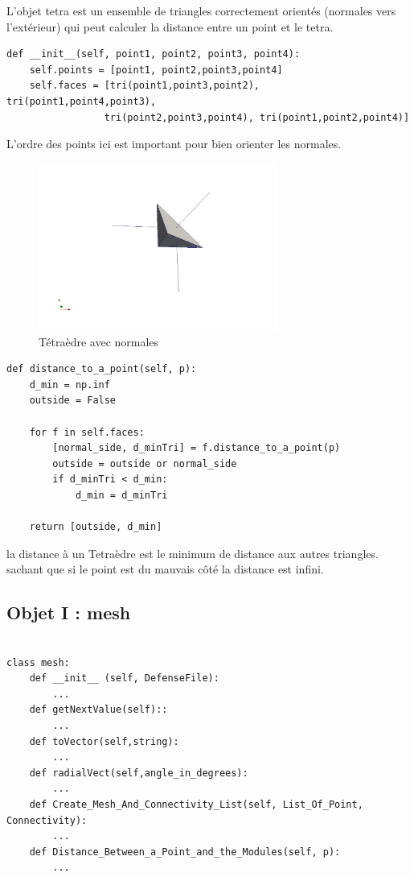 \documentclass[french]{article}
\begin{document}
L'objet tetra est un ensemble de triangles correctement orientés (normales vers l'extérieur) qui peut
calculer la distance entre un point et le tetra.
\begin{verbatim}
def __init__(self, point1, point2, point3, point4):
	self.points = [point1, point2,point3,point4]
	self.faces = [tri(point1,point3,point2), tri(point1,point4,point3),
				 tri(point2,point3,point4), tri(point1,point2,point4)]
\end{verbatim}
L'ordre des points ici est important pour bien orienter les normales.
\begin{figure}[h]
	\centering
	\includegraphics[width=0.7\textwidth]{Figures/TetraNormals.png}
	\caption{Tétraèdre avec normales}
\end{figure}

\begin{verbatim}
def distance_to_a_point(self, p):
	d_min = np.inf 
	outside = False
	
	for f in self.faces:
		[normal_side, d_minTri] = f.distance_to_a_point(p)
		outside = outside or normal_side
		if d_minTri < d_min:
			d_min = d_minTri
	
	return [outside, d_min] 
\end{verbatim}
la distance à un Tetraèdre est le minimum de distance aux autres triangles. sachant que si le point
est du mauvais côté la distance est infini.

\subsection{Objet I : mesh}
\vspace{10pt}
\begin{verbatim}

class mesh:
	def __init__ (self, DefenseFile):
		...
	def getNextValue(self)::
		...
	def toVector(self,string):
		...
	def radialVect(self,angle_in_degrees):
		...
	def Create_Mesh_And_Connectivity_List(self, List_Of_Point, Connectivity):
		...
	def Distance_Between_a_Point_and_the_Modules(self, p):
		...

\end{verbatim}
\end{document}
